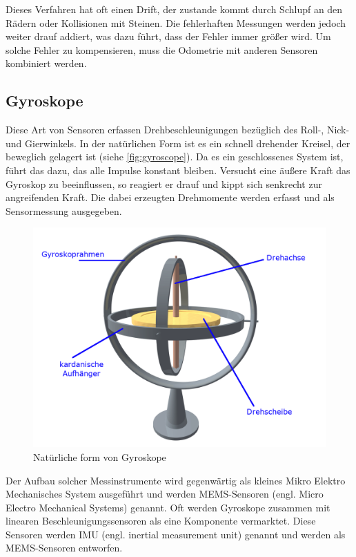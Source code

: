 Dieses Verfahren hat oft einen Drift, der zustande kommt durch Schlupf an den Rädern oder Kollisionen mit Steinen. Die fehlerhaften Messungen werden jedoch weiter drauf addiert, was dazu führt, dass der Fehler immer größer wird. Um solche Fehler zu kompensieren, muss die Odometrie mit anderen Sensoren kombiniert werden.\cite[S.171ff]{SensorenAutomation.2014}

\subsection{Gyroskope} \label{subsubsec:gyroskope}
Diese Art von Sensoren erfassen Drehbeschleunigungen bezüglich des Roll-, Nick- und Gierwinkels. In der natürlichen Form ist es ein schnell drehender Kreisel, der beweglich gelagert ist (siehe \autoref{fig:gyroscope}). Da es ein geschlossenes System ist, führt das dazu, das alle Impulse konstant bleiben. Versucht eine äußere Kraft das Gyroskop zu beeinflussen, so reagiert er drauf und kippt sich senkrecht zur angreifenden Kraft. Die dabei erzeugten Drehmomente werden erfasst und als Sensormessung ausgegeben.
\begin{figure}[H]
 \centering
 \includegraphics[width=0.5\linewidth]{Bilder/Grundlagen/3D_Gyroscope.png}
 \caption{Natürliche form von Gyroskope \cite{wikiGyroskope.2021}}
 \label{fig:gyroscope}
\end{figure}
Der Aufbau solcher Messinstrumente wird gegenwärtig als kleines Mikro Elektro Mechanisches System ausgeführt und werden MEMS-Sensoren (engl. Micro Electro Mechanical Systems) genannt. Oft werden Gyroskope zusammen mit linearen Beschleunigungssensoren als eine Komponente vermarktet. Diese Sensoren werden IMU (engl. inertial measurement unit) genannt und werden als MEMS-Sensoren entworfen. \cite[S.31f]{RobotikSichtInformatik.2012} 


